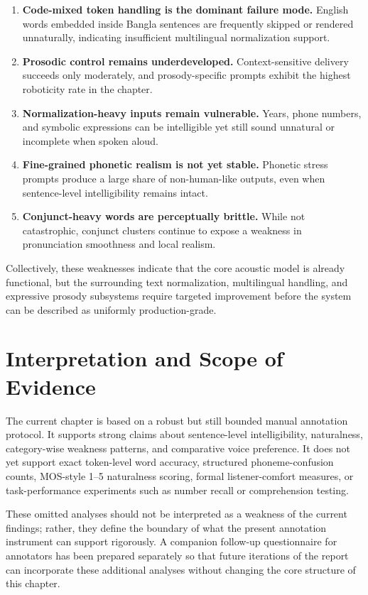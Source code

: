 \begin{enumerate}
\item \textbf{Code-mixed token handling is the dominant failure mode.} English words embedded inside Bangla sentences are frequently skipped or rendered unnaturally, indicating insufficient multilingual normalization support.
\item \textbf{Prosodic control remains underdeveloped.} Context-sensitive delivery succeeds only moderately, and prosody-specific prompts exhibit the highest roboticity rate in the chapter.
\item \textbf{Normalization-heavy inputs remain vulnerable.} Years, phone numbers, and symbolic expressions can be intelligible yet still sound unnatural or incomplete when spoken aloud.
\item \textbf{Fine-grained phonetic realism is not yet stable.} Phonetic stress prompts produce a large share of non-human-like outputs, even when sentence-level intelligibility remains intact.
\item \textbf{Conjunct-heavy words are perceptually brittle.} While not catastrophic, conjunct clusters continue to expose a weakness in pronunciation smoothness and local realism.
\end{enumerate}

Collectively, these weaknesses indicate that the core acoustic model is already functional, but the surrounding text normalization, multilingual handling, and expressive prosody subsystems require targeted improvement before the system can be described as uniformly production-grade.

\section{Interpretation and Scope of Evidence}

The current chapter is based on a robust but still bounded manual annotation protocol. It supports strong claims about sentence-level intelligibility, naturalness, category-wise weakness patterns, and comparative voice preference. It does not yet support exact token-level word accuracy, structured phoneme-confusion counts, MOS-style 1--5 naturalness scoring, formal listener-comfort measures, or task-performance experiments such as number recall or comprehension testing.

These omitted analyses should not be interpreted as a weakness of the current findings; rather, they define the boundary of what the present annotation instrument can support rigorously. A companion follow-up questionnaire for annotators has been prepared separately so that future iterations of the report can incorporate these additional analyses without changing the core structure of this chapter.

